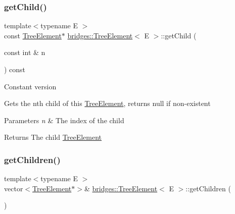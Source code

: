 \subsubsection{\texorpdfstring{get\+Child()}{getChild()}\hspace{0.1cm}{\footnotesize\ttfamily [2/2]}}
{\footnotesize\ttfamily template$<$typename E $>$ \\
const \mbox{\hyperlink{classbridges_1_1_tree_element}{Tree\+Element}}$\ast$ \mbox{\hyperlink{classbridges_1_1_tree_element}{bridges\+::\+Tree\+Element}}$<$ E $>$\+::get\+Child (\begin{DoxyParamCaption}\item[{const int \&}]{n }\end{DoxyParamCaption}) const\hspace{0.3cm}{\ttfamily [inline]}}

Constant version

Gets the nth child of this \mbox{\hyperlink{classbridges_1_1_tree_element}{Tree\+Element}}, returns null if non-\/existent


\begin{DoxyParams}{Parameters}
{\em n} & The index of the child \\
\hline
\end{DoxyParams}
\begin{DoxyReturn}{Returns}
The child \mbox{\hyperlink{classbridges_1_1_tree_element}{Tree\+Element}} 
\end{DoxyReturn}
\mbox{\label{classbridges_1_1_tree_element_a52cb83546da21674d306cbb8026f89ac}} 
\subsubsection{\texorpdfstring{get\+Children()}{getChildren()}\hspace{0.1cm}{\footnotesize\ttfamily [1/2]}}
{\footnotesize\ttfamily template$<$typename E $>$ \\
vector$<$\mbox{\hyperlink{classbridges_1_1_tree_element}{Tree\+Element}}$\ast$$>$\& \mbox{\hyperlink{classbridges_1_1_tree_element}{bridges\+::\+Tree\+Element}}$<$ E $>$\+::get\+Children (\begin{DoxyParamCaption}{ }\end{DoxyParamCaption})\hspace{0.3cm}{\ttfamily [inline]}}


